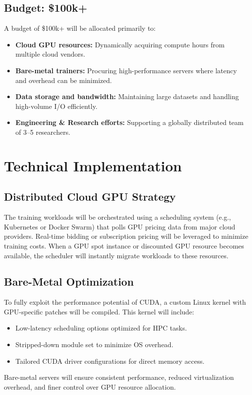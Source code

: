 \documentclass{article}
\begin{document}
\subsection{Budget: \$100k+}
A budget of \$100k+ will be allocated primarily to:
\begin{itemize}
    \item \textbf{Cloud GPU resources:} Dynamically acquiring compute hours from multiple cloud vendors.
    \item \textbf{Bare-metal trainers:} Procuring high-performance servers where latency and overhead can be minimized.
    \item \textbf{Data storage and bandwidth:} Maintaining large datasets and handling high-volume I/O efficiently.
    \item \textbf{Engineering \& Research efforts:} Supporting a globally distributed team of 3--5 researchers.
\end{itemize}

\section{Technical Implementation}
\subsection{Distributed Cloud GPU Strategy}
The training workloads will be orchestrated using a scheduling system (e.g., Kubernetes or Docker Swarm) that polls GPU pricing data from major cloud providers. Real-time bidding or subscription pricing will be leveraged to minimize training costs. When a GPU spot instance or discounted GPU resource becomes available, the scheduler will instantly migrate workloads to these resources.

\subsection{Bare-Metal Optimization}
To fully exploit the performance potential of CUDA, a custom Linux kernel with GPU-specific patches will be compiled. This kernel will include:
\begin{itemize}
    \item Low-latency scheduling options optimized for HPC tasks.
    \item Stripped-down module set to minimize OS overhead.
    \item Tailored CUDA driver configurations for direct memory access.
\end{itemize}
Bare-metal servers will ensure consistent performance, reduced virtualization overhead, and finer control over GPU resource allocation.
\end{document}
